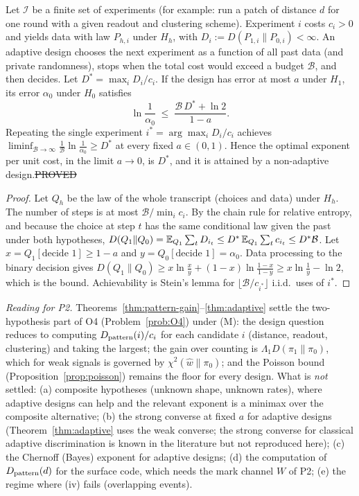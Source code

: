 \begin{theorem}\label{thm:adaptive}
Let $\mathcal I$ be a finite set of experiments (for example: run a patch of distance $d$ for one round with a given readout and clustering scheme). Experiment $i$ costs $c_i>0$ and yields data with law $P_{h,i}$ under $H_h$, with $D_i:=D(P_{1,i}\|P_{0,i})<\infty$. An adaptive design chooses the next experiment as a function of all past data (and private randomness), stops when the total cost would exceed a budget $\mathcal B$, and then decides. Let $D^\ast=\max_iD_i/c_i$.
If the design has error at most $a$ under $H_1$, its error $\alpha_0$ under $H_0$ satisfies
\[
\ln\frac1{\alpha_0}\;\le\;\frac{\mathcal B\,D^\ast+\ln2}{1-a}.
\]
Repeating the single experiment $i^\ast=\arg\max_iD_i/c_i$ achieves $\liminf_{\mathcal B\to\infty}\tfrac1{\mathcal B}\ln\tfrac1{\alpha_0}\ge D^\ast$ at every fixed $a\in(0,1)$. Hence the optimal exponent per unit cost, in the limit $a\to0$, is $D^\ast$, and it is attained by a non-adaptive design.\hfill\st{PROVED}
\end{theorem}
\begin{proof}
Let $Q_h$ be the law of the whole transcript (choices and data) under $H_h$. The number of steps is at most $\mathcal B/\min_ic_i$. By the chain rule for relative entropy, and because the choice at step $t$ has the same conditional law given the past under both hypotheses,
$D(Q_1\|Q_0)=\mathbb{E}_{Q_1}\sum_tD_{i_t}\le D^\ast\,\mathbb{E}_{Q_1}\sum_tc_{i_t}\le D^\ast\mathcal B$.
Let $x=Q_1[\text{decide }1]\ge1-a$ and $y=Q_0[\text{decide }1]=\alpha_0$. Data processing to the binary decision gives $D(Q_1\|Q_0)\ge x\ln\tfrac xy+(1-x)\ln\tfrac{1-x}{1-y}\ge x\ln\tfrac1y-\ln2$, which is the bound. Achievability is Stein's lemma for $\lfloor\mathcal B/c_{i^\ast}\rfloor$ i.i.d.\ uses of $i^\ast$.
\end{proof}

\noindent\emph{Reading for P2.} Theorems~\ref{thm:pattern-gain}--\ref{thm:adaptive} settle the two-hypothesis part of O4 (Problem~\ref{prob:O4}) under (M): the design question reduces to computing $D_{\rm pattern}(i)/c_i$ for each candidate $i$ (distance, readout, clustering) and taking the largest; the gain over counting is $\Lambda_1D(\pi_1\|\pi_0)$, which for weak signals is governed by $\chi^2(\hat w\|\pi_0)$; and the Poisson bound (Proposition~\ref{prop:poisson}) remains the floor for every design.
What is \emph{not} settled: (a) composite hypotheses (unknown shape, unknown rates), where adaptive designs can help and the relevant exponent is a minimax over the composite alternative; (b) the strong converse at fixed $a$ for adaptive designs (Theorem~\ref{thm:adaptive} uses the weak converse; the strong converse for classical adaptive discrimination is known in the literature but not reproduced here); (c) the Chernoff (Bayes) exponent for adaptive designs; (d) the computation of $D_{\rm pattern}(d)$ for the surface code, which needs the mark channel $W$ of P2; (e) the regime where (iv) fails (overlapping events).

